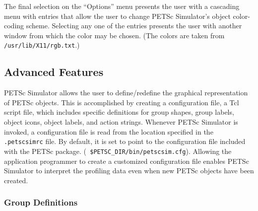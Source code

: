 The final selection on the ``Options'' menu presents the user with a
cascading menu with entries that allow the user to change PETSc
Simulator's object color-coding scheme.  Selecting any one of the
entries presents the user with another window from which the color may
be chosen.  (The colors are taken from {\tt /usr/lib/X11/rgb.txt}.)

\subsection{Advanced Features}

PETSc Simulator allows the user to define/redefine the graphical
representation of PETSc objects.  This is accomplished by creating a
configuration file, a Tcl script file, which includes specific
definitions for group shapes, group labels, object icons, object
labels, and action strings.  Whenever PETSc Simulator is invoked, a
configuration file is read from the location specified in the {\tt
.petscsimrc} file.  By default, it is set to point to the
configuration file included with the PETSc package.  ({\tt
\$PETSC\_DIR/bin/petscsim.cfg}).  Allowing the application programmer
to create a customized configuration file enables PETSc Simulator to
interpret the profiling data even when new PETSc objects have been
created.

\subsubsection{Group Definitions}


